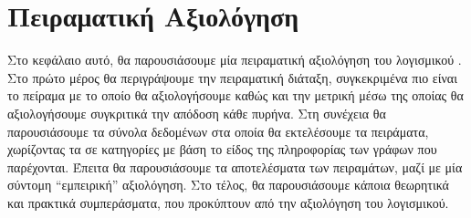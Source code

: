 \chapter{Πειραματική Αξιολόγηση}
\label{chap4}
Στο κεφάλαιο αυτό, θα παρουσιάσουμε μία πειραματική αξιολόγηση του λογισμικού .
Στο πρώτο μέρος θα περιγράψουμε την πειραματική διάταξη, συγκεκριμένα πιο είναι το πείραμα με το οποίο θα αξιολογήσουμε καθώς και την μετρική μέσω της οποίας θα αξιολογήσουμε συγκριτικά την απόδοση κάθε πυρήνα.
Στη συνέχεια θα παρουσιάσουμε τα σύνολα δεδομένων στα οποία θα εκτελέσουμε τα πειράματα, χωρίζοντας τα σε κατηγορίες με βάση το είδος της πληροφορίας των γράφων που παρέχονται.
Έπειτα θα παρουσιάσουμε τα αποτελέσματα των πειραμάτων, μαζί με μία σύντομη ``εμπειρική'' αξιολόγηση.
Στο τέλος, θα παρουσιάσουμε κάποια θεωρητικά και πρακτικά συμπεράσματα, που προκύπτουν από την αξιολόγηση του λογισμικού.
